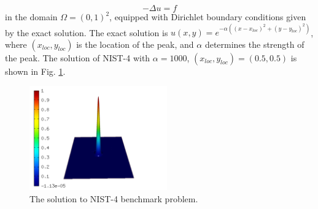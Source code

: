 \documentclass[12pt]{elsarticle}
\begin{document}
\begin{equation} \label{poisson-peak}
-\Delta u = f
\end{equation}
in the domain $\Omega = (0, 1)^2$, equipped with Dirichlet
boundary conditions given by the exact solution.
The exact solution is
$u(x,y) = e^{-\alpha ((x - x_{loc})^{2} + (y - y_{loc})^{2})}$,
where $(x_{loc}, y_{loc})$ is the location of the peak,
and $\alpha$ determines the strength of the peak.
The solution of NIST-4 with $\alpha = 1000$,
$(x_{loc}, y_{loc}) = (0.5, 0.5)$ is shown in Fig. \ref{fig:sln-nist04}.

\begin{figure}[H]
\centering
\vspace{-4mm}
\includegraphics[height=4.5cm]{nist/nist-4/solution.png}
\vspace{-2mm}
\caption{The solution to NIST-4 benchmark problem.}
\vspace{-3mm}
\label{fig:sln-nist04}
\end{figure}
\end{document}

